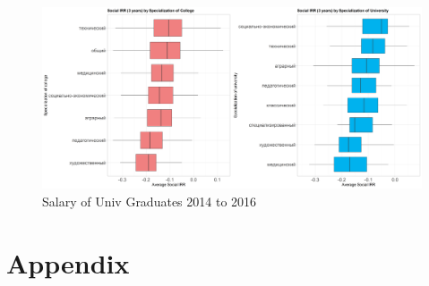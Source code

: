\documentclass[alpha-refs]{wiley-article-05g}
\begin{document}
\begin{center}
	\begin{figure}[htbp!]
\begin{minipage}[b]{1\linewidth}
			\centering
			\includegraphics[width=6in]{returns_by_areas.png}
		\end{minipage}
			\caption{Salary of Univ Graduates 2014 to 2016}\label{fig:1.18}
	\end{figure}
\end{center}


\newpage

\printbibliography

\newpage
\section*{Appendix}
%

\setcounter{table}{0}
\renewcommand{\thetable}{A\arabic{table}}

\setcounter{figure}{0}
\renewcommand{\thefigure}{A\arabic{figure}}
\end{document}
